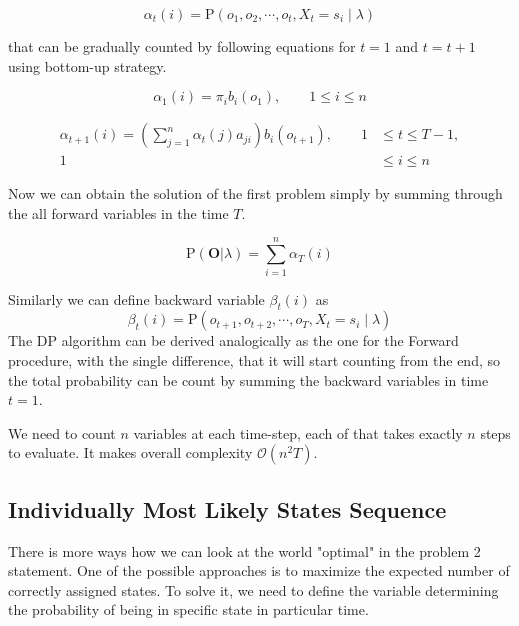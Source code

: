 \documentclass[thesis=M,english]{FITthesis}[2012/10/20]
\newcommand{\matr}[1]{\mathbf{#1}}
\begin{document}
\begin{equation}
\alpha_t(i) = \mathrm{P}(o_1,o_2,\cdots,o_t,X_t = s_i \mid \lambda )
\end{equation}

that can be gradually counted by following equations for $t=1$ and $t=t+1$ using bottom-up strategy.

\begin{equation}
\alpha_1(i) = \pi_i b_i(o_1), \qquad 1 \leq i \leq n
\end{equation}

\begin{equation}
\begin{aligned}
\alpha_{t+1}(i) = \left( \sum_{j=1}^n \alpha_t(j) a_{ji} \right) b_i(o_{t+1}), \qquad 1& \leq t \leq T - 1, \\ 
                                                                                 1& \leq i \leq n		\end{aligned}
\end{equation}

Now we can obtain the solution of the first problem simply by summing through the all forward variables in the time $T$.

\begin{equation}
\mathrm{P}(\matr{O}|\lambda) = \sum_{i=1}^n \alpha_T(i)
\end{equation} 

Similarly we can define backward variable $\beta_t(i)$ as
\begin{equation}
\beta_t(i) = \mathrm{P}(o_{t+1},o_{t+2},\cdots,o_T,X_t = s_i \mid \lambda ) 
\end{equation}
The DP algorithm can be derived analogically as the one for the Forward procedure, with the single difference, that it will start counting from the end, so the total probability can be count by summing the backward variables in time $t=1$.

We need to count $n$ variables at each time-step, each of that takes exactly $n$ steps to evaluate. It makes overall complexity $\mathcal{O}(n^2T)$.    

\subsection{Individually Most Likely States Sequence}
There is more ways how we can look at the world "optimal" in the problem 2 statement. One of the possible approaches is to maximize the expected number of correctly assigned states. To solve it, we need to define the variable determining the probability of being in specific state in particular time.
\end{document}
